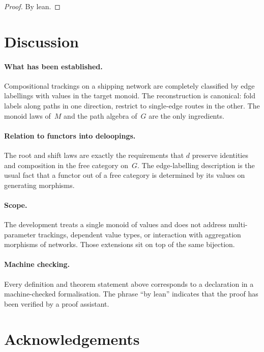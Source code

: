 \documentclass[11pt,a4paper]{article}
\theoremstyle{plain}
\theoremstyle{definition}
\begin{document}
\begin{proof}
By lean.
\end{proof}

\section{Discussion}

\paragraph{What has been established.}
Compositional trackings on a shipping network are completely classified by
edge labellings with values in the target monoid. The reconstruction is
canonical: fold labels along paths in one direction, restrict to single-edge
routes in the other. The monoid laws of~$M$ and the path algebra of~$G$ are the
only ingredients.

\paragraph{Relation to functors into deloopings.}
The root and shift laws are exactly the requirements that $d$ preserve
identities and composition in the free category on~$G$. The edge-labelling
description is the usual fact that a functor out of a free category is
determined by its values on generating morphisms.

\paragraph{Scope.}
The development treats a single monoid of values and does not address
multi-parameter trackings, dependent value types, or interaction with
aggregation morphisms of networks. Those extensions sit on top of the same
bijection.

\paragraph{Machine checking.}
Every definition and theorem statement above corresponds to a declaration in a
machine-checked formalisation. The phrase ``by lean'' indicates that the proof
has been verified by a proof assistant.

\section*{Acknowledgements}
\end{document}
